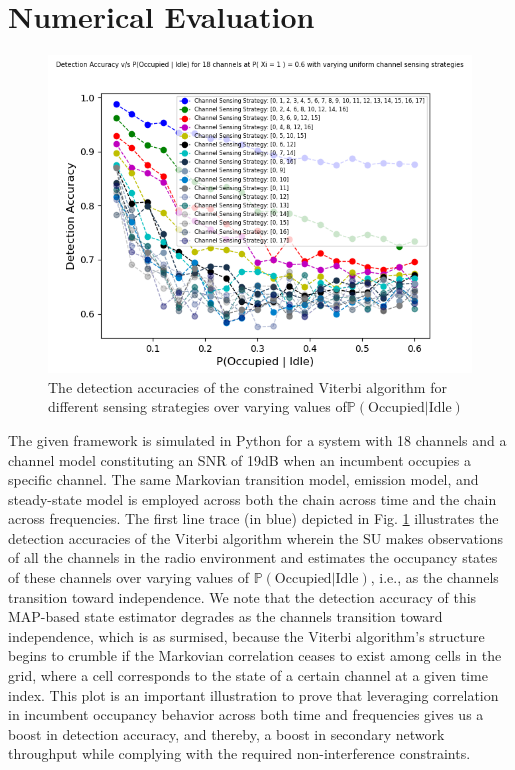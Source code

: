 \documentclass[10pt,twocolumn]{IEEEtran}
\begin{document}
\section{Numerical Evaluation}\label{IV}
\begin{figure}
    \centering
    \includegraphics[scale=0.5]{Uniform_Channel_Sensing.png}
    \caption{The detection accuracies of the constrained Viterbi algorithm for different sensing strategies over varying values of$\mathbb{P}(\text{Occupied}|\text{Idle})$}
    \label{fig:2}
\end{figure}
The given framework is simulated in Python for a system with 18 channels and a channel model constituting an SNR of 19dB when an incumbent occupies a specific channel. The same Markovian transition model, emission model, and steady-state model is employed across both the chain across time and the chain across frequencies. The first line trace (in blue) depicted in Fig. \ref{fig:2} illustrates the detection accuracies of the Viterbi algorithm wherein the SU makes observations of all the channels in the radio environment and estimates the occupancy states of these channels over varying values of $\mathbb{P}(\text{Occupied}|\text{Idle})$, i.e., as the channels transition toward independence. We note that the detection accuracy of this MAP-based state estimator degrades as the channels transition toward independence, which is as surmised, because the Viterbi algorithm's structure begins to crumble if the Markovian correlation ceases to exist among cells in the grid, where a cell corresponds to the state of a certain channel at a given time index. This plot is an important illustration to prove that leveraging correlation in incumbent occupancy behavior across both time and frequencies gives us a boost in detection accuracy, and thereby, a boost in secondary network throughput while complying with the required non-interference constraints.
\end{document}

